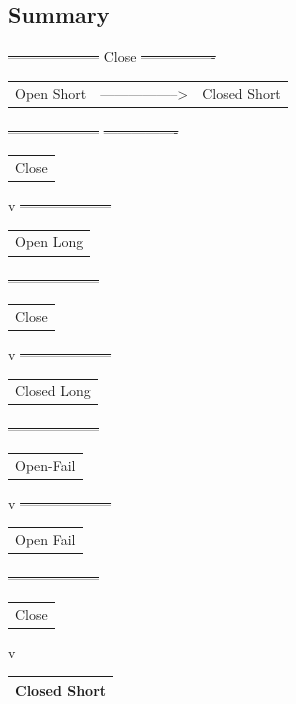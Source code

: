 \documentclass[11pt]{article}
\begin{document}
\subsection{Summary}
\label{sec:org1e2ad7c}
\sout{--------------------}       Close       \sout{----------------}
\begin{center}
\begin{tabular}{lll}
Open Short & -----------------> & Closed Short\\[0pt]
\end{tabular}
\end{center}
\sout{--------------------}                   \sout{----------------}
\begin{center}
\begin{tabular}{l}
Close\\[0pt]
\end{tabular}
\end{center}
v
\sout{--------------------}
\begin{center}
\begin{tabular}{l}
Open Long\\[0pt]
\end{tabular}
\end{center}
\sout{--------------------}
\begin{center}
\begin{tabular}{l}
Close\\[0pt]
\end{tabular}
\end{center}
v
\sout{--------------------}
\begin{center}
\begin{tabular}{l}
Closed Long\\[0pt]
\end{tabular}
\end{center}
\sout{--------------------}
\begin{center}
\begin{tabular}{l}
Open-Fail\\[0pt]
\end{tabular}
\end{center}
v
\sout{--------------------}
\begin{center}
\begin{tabular}{l}
Open Fail\\[0pt]
\end{tabular}
\end{center}
\sout{--------------------}
\begin{center}
\begin{tabular}{l}
Close\\[0pt]
\end{tabular}
\end{center}
v
\begin{center}
\begin{tabular}{|l|}
\hline
Closed Short \\
\hline
\end{tabular}
\end{center}
\end{document}

